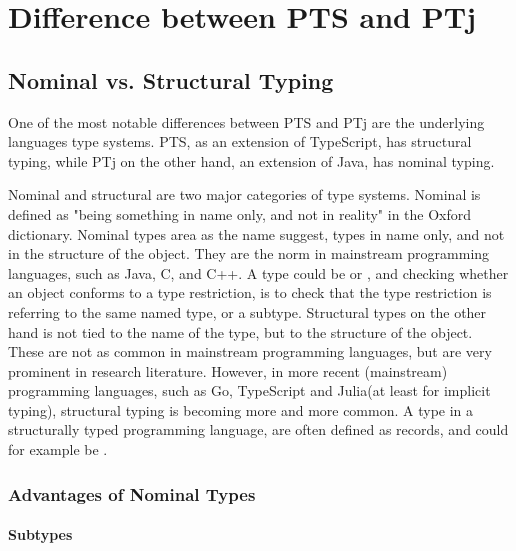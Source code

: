 
\chapter{Difference between PTS and PTj}\label{ch:difference-between-pts-and-ptj}


\section{Nominal vs. Structural Typing}\label{sec:nominal-vs-structural-typing}


One of the most notable differences between PTS and PTj are the underlying languages type systems.
PTS, as an extension of TypeScript, has structural typing, while PTj on the other hand, an extension of Java, has nominal typing.

Nominal and structural are two major categories of type systems.
Nominal is defined as "being something in name only, and not in reality" in the Oxford dictionary.
Nominal types area as the name suggest, types in name only, and not in the structure of the object.
They are the norm in mainstream programming languages, such as Java, C, and C++.
A type could be  or , and checking whether an object conforms to a type restriction, is to check that the type restriction is referring to the same named type, or a subtype.
Structural types on the other hand is not tied to the name of the type, but to the structure of the object.
These are not as common in mainstream programming languages, but are very prominent in research literature.
However, in more recent (mainstream) programming languages, such as Go, TypeScript and Julia(at least for implicit typing), structural typing is becoming more and more common.
A type in a structurally typed programming language, are often defined as records, and could for example be .

\subsection{Advantages of Nominal Types}\label{subsec:advantages-of-nominal-types}

\subsubsection{Subtypes}\label{subsubsec:subtypes}

